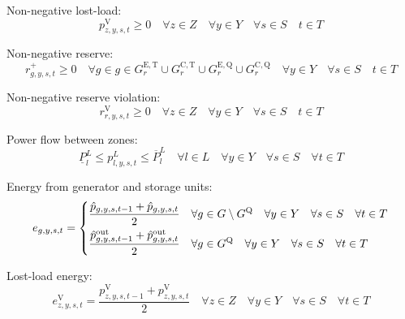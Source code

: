 \documentclass{article}
\newcommand{\sGenerators}{G}
\newcommand{\sGeneratorsExistingThermal}{G^{\mathrm{E,T}}}
\newcommand{\sGeneratorsCandidateThermal}{G^{\mathrm{C,T}}}
\newcommand{\sStorage}{G^{\mathrm{Q}}}
\newcommand{\sStorageExisting}{G^{\mathrm{E,Q}}}
\newcommand{\sStorageCandidate}{G^{\mathrm{C,Q}}}
\newcommand{\sYears}{Y}
\newcommand{\sScenarios}{S}
\newcommand{\sIntervals}{T}
\newcommand{\sZones}{Z}
\newcommand{\sLinks}{L}
\newcommand{\iGenerator}{g}
\newcommand{\iYear}{y}
\newcommand{\iScenario}{s}
\newcommand{\iInterval}{t}
\newcommand{\iZone}{z}
\newcommand{\iRegion}{r}
\newcommand{\iLink}{l}
\newcommand{\cPowerFlowMin}{\underline{P}_{\iLink}^{L}}
\newcommand{\cPowerFlowMax}{\overline{P}_{\iLink}^{L}}
\newcommand{\vEnergy}[1][\iGenerator,\iYear,\iScenario,\iInterval]{e_{#1}}
\newcommand{\vReserveUp}[1][\iGenerator,\iYear,\iScenario,\iInterval]{r^{+}_{#1}}
\newcommand{\vReserveUpViolation}[1][\iRegion,\iYear,\iScenario,\iInterval]{r^{\mathrm{V}}_{#1}}
\newcommand{\vPowerTotal}[1][\iGenerator,\iYear,\iScenario,\iInterval]{\hat{p}_{#1}}
\newcommand{\vPowerTotalOut}[1][\iGenerator,\iYear,\iScenario,\iInterval]{\hat{p}^{\mathrm{out}}_{#1}}
\newcommand{\vPowerFlow}[1][\iLink,\iYear,\iScenario,\iInterval]{p^{\sLinks}_{#1}}
\newcommand{\vLostLoadEnergy}[1][\iZone,\iYear,\iScenario,\iInterval]{e^{\mathrm{V}}_{#1}}
\newcommand{\vLostLoadPower}[1][\iZone,\iYear,\iScenario,\iInterval]{p^{\mathrm{V}}_{#1}}
\begin{document}
Non-negative lost-load:
\begin{equation}
\vLostLoadPower \geq 0 \quad \forall \iZone \in \sZones \quad \forall \iYear \in \sYears \quad \forall \iScenario \in \sScenarios \quad \iInterval \in \sIntervals
\end{equation}

Non-negative reserve:
\begin{equation}
\vReserveUp \geq 0 \quad \forall \iGenerator \in \iGenerator \in \sGeneratorsExistingThermal_{\iRegion} \cup \sGeneratorsCandidateThermal_{\iRegion} \cup \sStorageExisting_{\iRegion} \cup \sStorageCandidate_{\iRegion} \quad \forall \iYear \in \sYears \quad \forall \iScenario \in \sScenarios \quad \iInterval \in \sIntervals
\end{equation}

Non-negative reserve violation:
\begin{equation}
\vReserveUpViolation \geq 0 \quad \forall \iZone \in \sZones \quad \forall \iYear \in \sYears \quad \forall \iScenario \in \sScenarios \quad \iInterval \in \sIntervals
\end{equation}

Power flow between zones:
\begin{equation}
\cPowerFlowMin \leq \vPowerFlow \leq \cPowerFlowMax \quad \forall \iLink \in \sLinks \quad \forall \iYear \in \sYears \quad \forall \iScenario \in \sScenarios \quad \forall \iInterval \in \sIntervals
\label{eqn: powerflow constraints}
\end{equation}

Energy from generator and storage units:
\begin{equation}
\vEnergy = \begin{dcases}
\frac{\vPowerTotal[\iGenerator, \iYear,\iScenario,\iInterval-1] + \vPowerTotal}{2} & \forall \iGenerator \in \sGenerators \setminus \sStorage \quad \forall \iYear \in \sYears \quad \forall \iScenario \in \sScenarios \quad \forall \iInterval \in \sIntervals\\
\frac{\vPowerTotalOut[\iGenerator, \iYear,\iScenario,\iInterval-1] + \vPowerTotalOut}{2} & \forall \iGenerator \in \sStorage \quad \forall \iYear \in \sYears \quad \forall \iScenario \in \sScenarios \quad \forall \iInterval \in \sIntervals\\
\end{dcases}
\end{equation}

Lost-load energy:
\begin{equation}
\vLostLoadEnergy = \frac{\vLostLoadPower[\iZone, \iYear,\iScenario,\iInterval-1] + \vLostLoadPower}{2} \quad \forall \iZone \in \sZones \quad \forall \iYear \in \sYears \quad \forall \iScenario \in \sScenarios \quad \forall \iInterval \in \sIntervals
\end{equation}
\end{document}
